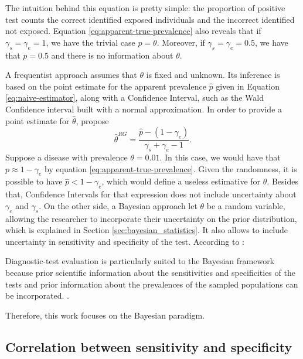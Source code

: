 The intuition behind this equation is pretty simple: the proportion
of positive test counts the correct identified exposed individuals and the
incorrect identified not exposed. Equation \eqref{eq:apparent-true-prevalence}
also reveals that if $\gamma_s = \gamma_e = 1$, we have the trivial 
case $p = \theta$. Moreover, if $\gamma_s = \gamma_e = 0.5$, we have that
$p = 0.5$ and there is no information about $\theta$. 

A frequentist approach assumes that $\theta$ is fixed and unknown. Its
inference is based on the point 
estimate for the apparent prevalence $\hat{p}$ given in Equation
\eqref{eq:naive-estimator}, along with a Confidence Interval, such as the Wald
Confidence interval built with a normal approximation. In order to provide a 
point estimate for $\hat{\theta}$, \textcite[p. 73]{rogan1978estimating}
propose
\begin{equation}
  \label{eq:rogan-estimate-prevalence}
  \hat{\theta}^{RG} = \frac{\hat{p} - (1-\gamma_e)}{\gamma_s + \gamma_e -
1}.
\end{equation}
Suppose a disease with prevalence $\theta = 0.01$. In this case, we would have
that $p \approx 1 - \gamma_e$ by equation \eqref{eq:apparent-true-prevalence}.
Given the randomness, it is possible to have $\hat{p} < 1 - \gamma_e$, which
would define a useless estimative for $\theta$. Besides that, Confidence Intervals for that 
expression does not include uncertainty about $\gamma_e$ and $\gamma_s$. On
the other side, a Bayesian approach let $\theta$ be a random variable,
allowing the researcher to incorporate their uncertainty on the prior
distribution, which is explained in Section
\ref{sec:bayesian_statistics}. It also allows to include uncertainty in
sensitivity and specificity of the test. According to \textcite{branscum2005estimation}:
\begin{citacao}
  Diagnostic-test evaluation is particularly suited to the
  Bayesian framework because prior scientific information about the
  sensitivities and specificities of the tests and prior information about the prevalences of the sampled
  populations can be incorporated. \cite[p. 1]{branscum2005estimation}.
\end{citacao}

Therefore, this work focuses on the Bayesian paradigm. 

\subsection{Correlation between sensitivity and specificity}
\label{sec:correlation-sensitivity-specificity}

